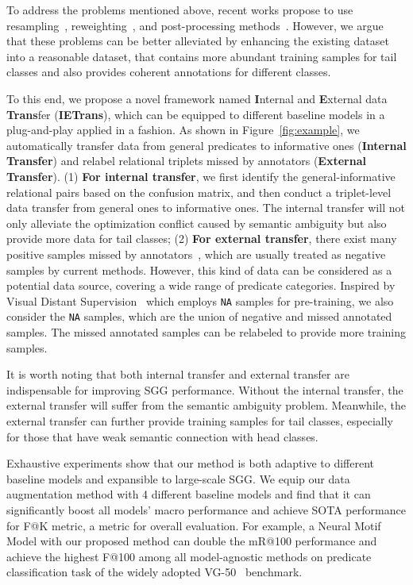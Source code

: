 \documentclass[runningheads]{llncs}
\begin{document}
To address the problems mentioned above, recent works propose to use resampling~\cite{desai2021learning,li2021bipartite}, reweighting~\cite{yan2020pcpl}, and post-processing methods~\cite{tang2020unbiased,guo2021general}. However, we argue that these problems can be better alleviated by enhancing the existing dataset into a reasonable dataset, that contains more abundant training samples for tail classes and also provides coherent annotations for different classes.


To this end, we propose a novel framework named \textbf{I}nternal and \textbf{E}xternal data \textbf{Trans}fer (\textbf{IETrans}), which can be equipped to different baseline models in a plug-and-play applied in a fashion.
As shown in Figure~\ref{fig:example}, we automatically transfer data from general predicates to informative ones (\textbf{Internal Transfer}) and relabel relational triplets missed by annotators (\textbf{External Transfer}).
(1) \textbf{For internal transfer}, we first identify the general-informative relational pairs based on the confusion matrix, and then conduct a triplet-level data transfer from general ones to informative ones.
The internal transfer will not only alleviate the optimization conflict caused by semantic ambiguity but also provide more data for tail classes;
(2) \textbf{For external transfer}, there exist many positive samples missed by annotators~\cite{krishna2017visual,lu2016visual}, which are usually treated as negative samples by current methods.
However, this kind of data can be considered as a potential data source, covering a wide range of predicate categories.
Inspired by Visual Distant Supervision~\cite{yao2021visual} which employs \texttt{NA} samples for pre-training, we also consider the \texttt{NA} samples, which are the union of negative and missed annotated samples.
The missed annotated samples can be relabeled to provide more training samples. 


It is worth noting that both internal transfer and external transfer are indispensable for improving SGG performance.
Without the internal transfer, the external transfer will suffer from the semantic ambiguity problem.
Meanwhile, the external transfer can further provide training samples for tail classes, especially for those that have weak semantic connection with head classes.

Exhaustive experiments show that our method is both adaptive to different baseline models and expansible to large-scale SGG.
We equip our data augmentation method with 4 different baseline models and find that it can significantly boost all models' macro performance and achieve SOTA performance for F@K metric, a metric for overall evaluation.
For example, a Neural Motif Model with our proposed method can double the mR@100 performance and achieve the highest F@100 among all model-agnostic methods on predicate classification task of the widely adopted VG-50~\cite{xu2017scene} benchmark.
\end{document}
